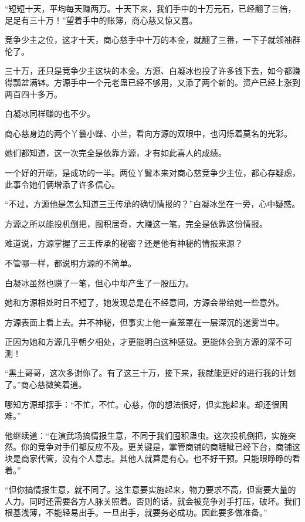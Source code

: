 
\begin{this_body}



“短短十天，平均每天赚两万。十天下来，我们手中的十万元石，已经翻了三倍，足足有三十万！”望着手中的账簿，商心慈又惊又喜。

竞争少主之位，这才十天，商心慈手中十万的本金，就翻了三番，一下子就领袖群伦了。

三十万，还只是竞争少主这块的本金。方源、白凝冰也投了许多钱下去，如今都赚得瓢盆满钵。方源手中一个元老蛊已经不够用，又添了两个新的。资产已经上涨到两百四十多万。

白凝冰同样赚的也不少。

商心慈身边的两个丫鬟小蝶、小兰，看向方源的双眼中，也闪烁着莫名的光彩。

她们都知道，这一次完全是依靠方源，才有如此喜人的成绩。

一个好的开端，是成功的一半。两位丫鬟本来对商心慈竞争少主位，都心存疑虑，此事令她们俩增添了许多信心。

“不过，方源他是怎么知道三王传承的确切情报的？”白凝冰坐在一旁，心中疑惑。

方源之所以能投机倒把，囤积居奇，大赚这一笔，完全是依靠这份情报。

难道说，方源掌握了三王传承的秘密？还是他有神秘的情报来源？

不管哪一样，都说明方源的不简单。

白凝冰虽然也赚了一笔，但心中却产生了一股压力。

她和方源相处时日不短了，她发现总是在不经意间，方源会带给她一些意外。

方源表面上看上去。并不神秘，但事实上他一直笼罩在一层深沉的迷雾当中。

正因为她和方源几乎朝夕相处，才更能明白这种感觉。更能体会到方源的深不可测！

“黑土哥哥，这次多谢你了。有了这三十万，接下来，我就能更好的进行我的计划了。”商心慈微笑着道。

哪知方源却摆手：“不忙，不忙。心慈，你的想法很好，但实施起来。却还很困难。”

他继续道：“在演武场搞情报生意，不同于我们囤积蛊虫。这次投机倒把，实施突然。你的竞争对手们都反应不及。更关键是，掌管商铺的商睚眦已经下台，商铺这块是商家代管，没有个人意志。其他人就算是有心。也不好干预。只能眼睁睁的看着。”

“但你搞情报生意，就不同了。这生意要实施起来，物力要求不高，但需要大量的人力。同时还需要各方人脉关照着。否则的话，就会被竞争对手打压，破坏。我们根基浅薄，不能轻易出手。一旦出手，就要务必成功。因此要多做准备。”


\end{this_body}
